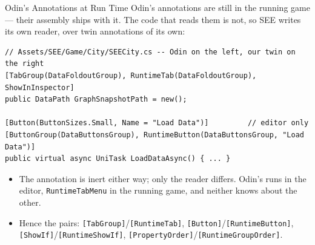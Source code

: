 \begin{frame}[fragile]{Odin's Annotations at Run Time}
  Odin's annotations are still in the running game --- their assembly ships
  with it. The code that reads them is not, so SEE writes its own reader, over
  twin annotations of its own:
  \vspace{1ex}

  \begin{lstlisting}[basicstyle=\scriptsize\ttfamily]
// Assets/SEE/Game/City/SEECity.cs -- Odin on the left, our twin on the right
[TabGroup(DataFoldoutGroup), RuntimeTab(DataFoldoutGroup), ShowInInspector]
public DataPath GraphSnapshotPath = new();

[Button(ButtonSizes.Small, Name = "Load Data")]         // editor only
[ButtonGroup(DataButtonsGroup), RuntimeButton(DataButtonsGroup, "Load Data")]
public virtual async UniTask LoadDataAsync() { ... }
  \end{lstlisting}
  \vspace{1ex}

  \begin{itemize}
    \item The annotation is inert either way; only the reader differs. Odin's
      runs in the editor, \texttt{RuntimeTabMenu} in the running game, and
      neither knows about the other.
    \item Hence the pairs: \texttt{[TabGroup]}/\texttt{[RuntimeTab]},
      \texttt{[Button]}/\texttt{[RuntimeButton]},
      \texttt{[ShowIf]}/\texttt{[RuntimeShowIf]},
      \texttt{[PropertyOrder]}/\texttt{[RuntimeGroupOrder]}.
  \end{itemize}
\end{frame}

